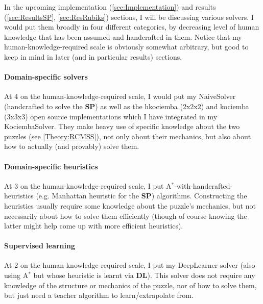 \label{sec:WHK}

In the upcoming implementation (\ref{sec:Implementation}) and results (\ref{sec:ResultsSP}, \ref{sec:ResRubiks}) sections, I will be discussing various solvers. I would put them broadly in four different categories, by decreasing level of human knowledge that has been assumed and handcrafted in them. Notice that my human-knowledge-required scale is obviously somewhat arbitrary, but good to keep in mind in later (and in particular results) sections.

\paragraph{Domain-specific solvers}
At 4 on the human-knowledge-required scale, I would put my NaiveSolver (handcrafted to solve the \textbf{SP}) as well as the hkociemba (2x2x2) and kociemba (3x3x3) open source implementations which I have integrated in my KociembaSolver. They make heavy use of specific knowledge about the two puzzles (see \ref{Theory:RCMSS}), not only about their mechanics, but also about how to actually (and provably) solve them.


\paragraph{Domain-specific heuristics}
At 3 on the human-knowledge-required scale, I put A$^{*}$-with-handcrafted-heuristics (e.g. Manhattan heuristic for the \textbf{SP}) algorithms. Constructing the heuristics usually require some knowledge about the puzzle's mechanics, but not necessarily about how to solve them efficiently (though of course knowing the latter might help come up with more efficient heuristics).


\paragraph{Supervised learning}
At 2 on the human-knowledge-required scale, I put my DeepLearner solver (also using A$^{*}$ but whose heuristic is learnt via \textbf{DL}). This solver does not require any knowledge of the structure or mechanics of the puzzle, nor of how to solve them, but just need a teacher algorithm to learn/extrapolate from.


